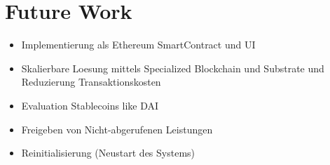 \section{Future Work}

\begin{itemize}
\item Implementierung als Ethereum SmartContract und UI
\item Skalierbare Loesung mittels Specialized Blockchain und Substrate und Reduzierung Transaktionskosten
\item Evaluation Stablecoins like DAI
\item Freigeben von Nicht-abgerufenen Leistungen
\item Reinitialisierung (Neustart des Systems)
\end{itemize}